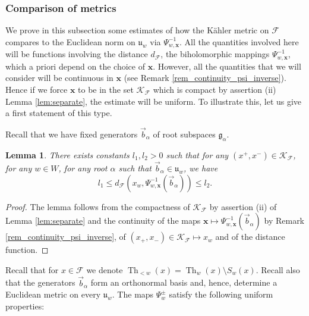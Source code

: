 \documentclass[12pt]{amsbook}%
\newtheorem{lem}[thm]{Lemma}
\theoremstyle{definition}
\theoremstyle{remark}
\numberwithin{section}{chapter}
\numberwithin{subsection}{section}
\numberwithin{figure}{chapter}
\DeclareMathOperator{\Th}{Th}
\def\dyl{>0}
\def\cF{{\mathscr{F}}}
\def\sK{{\mathscr{K}}}
\def\fu{{\mathfrak{u}}}
\def\xpair{{(x^+,x^-)}}
\def\bx{\mathbf{x}}
\def\al{\alpha}
\begin{document}
{{\subsubsection{Comparison of metrics}

We prove in this subsection some estimates of how the K\"ahler metric on $\cF$ compares to the Euclidean norm on $\fu_w$ via $\Psi_{w,\bx}^{-1}$. All the quantities involved here will be functions involving the distance $d_{\cF}$, the biholomorphic mappings $\Psi_{w,\bx}^{-1}$, which a priori depend on the choice of $\bx$. However, all the quantities that we will consider will be continuous in $\bx$ (see Remark \ref{rem_continuity_psi_inverse}). Hence if we force $\bx$ to be in the set $\mathcal{K}_{\cF}$ which is compact  by assertion (ii) Lemma \ref{lem:separate}, the estimate will be uniform.  To illustrate this, let us give a first statement of this type.

Recall that we have fixed generators $\vec{b}_\al$ of root subspaces ${\mathfrak g}_{\al}$.
\begin{lem}\label{lem:genarators_bounded_length}
There exists constants $l_1,l_2\dyl$ such that for any $\xpair\in \mathscr{K}_\cF$, for any $w\in W$, for any root $\al$ such that $\vec{b}_\al\in \fu_w$, we have 
\[
l_1\leqslant d_\cF\left(x_w, \Psi_{w,\bx}^{-1}(\vec{b}_\al)\right)\leqslant l_2.
\]
\end{lem}
\begin{proof}
The lemma follows from the compactness of $\sK_\cF$ by assertion (ii) of Lemma \ref{lem:separate} and the continuity of the maps $\bx \mapsto\Psi_{w,\bx}^{-1}(\vec{b}_\alpha)$ by Remark \ref{rem_continuity_psi_inverse}, of $(x_+,x_-) \in \mathcal{K}_{\cF} \mapsto x_{w} $ and of the distance function. 
\end{proof}



Recall that for $x\in \cF$ we denote $\Th_{<w}(x)=\Th_w(x)\setminus S_w(x)$. 
Recall also that the generators $\vec{b}_\al$ form an orthonormal basis and, hence, determine a Euclidean metric on every $\fu_w$. The maps $\Psi_w^\pm$ satisfy the following uniform properties:


}}
\end{document}
